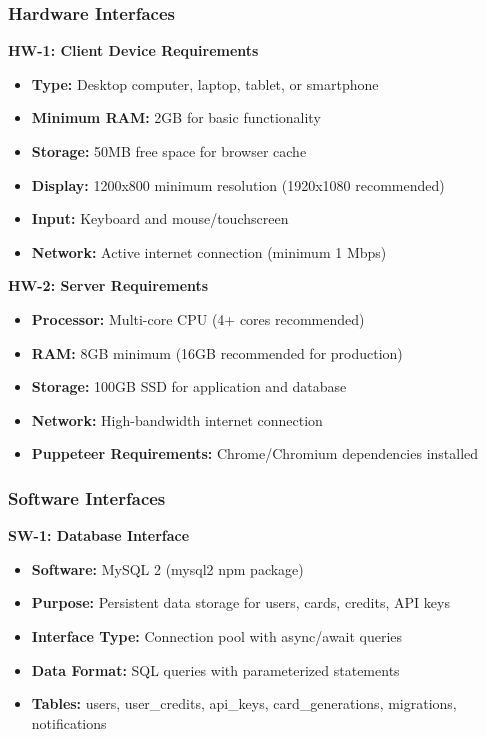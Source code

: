 \documentclass[12pt,a4paper]{article}
\begin{document}
\subsubsection{Hardware Interfaces}

\textbf{HW-1: Client Device Requirements}
\begin{itemize}
    \item \textbf{Type:} Desktop computer, laptop, tablet, or smartphone
    \item \textbf{Minimum RAM:} 2GB for basic functionality
    \item \textbf{Storage:} 50MB free space for browser cache
    \item \textbf{Display:} 1200x800 minimum resolution (1920x1080 recommended)
    \item \textbf{Input:} Keyboard and mouse/touchscreen
    \item \textbf{Network:} Active internet connection (minimum 1 Mbps)
\end{itemize}

\textbf{HW-2: Server Requirements}
\begin{itemize}
    \item \textbf{Processor:} Multi-core CPU (4+ cores recommended)
    \item \textbf{RAM:} 8GB minimum (16GB recommended for production)
    \item \textbf{Storage:} 100GB SSD for application and database
    \item \textbf{Network:} High-bandwidth internet connection
    \item \textbf{Puppeteer Requirements:} Chrome/Chromium dependencies installed
\end{itemize}

\subsubsection{Software Interfaces}

\textbf{SW-1: Database Interface}
\begin{itemize}
    \item \textbf{Software:} MySQL 2 (mysql2 npm package)
    \item \textbf{Purpose:} Persistent data storage for users, cards, credits, API keys
    \item \textbf{Interface Type:} Connection pool with async/await queries
    \item \textbf{Data Format:} SQL queries with parameterized statements
    \item \textbf{Tables:} users, user\_credits, api\_keys, card\_generations, migrations, notifications
\end{itemize}
\end{document}
